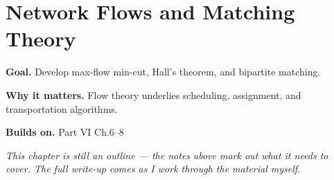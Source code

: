 \chapter{Network Flows and Matching Theory}
\label{ch:06-combinatorics-and-graph-theory-11}

\begin{chapterintro}
\textbf{Goal.} Develop max-flow min-cut, Hall's theorem, and bipartite matching.

\textbf{Why it matters.} Flow theory underlies scheduling, assignment, and transportation algorithms.

\textbf{Builds on.} Part VI Ch.6–8
\end{chapterintro}

\textit{This chapter is still an outline --- the notes above mark out what it needs to cover. The full write-up comes as I work through the material myself.}
